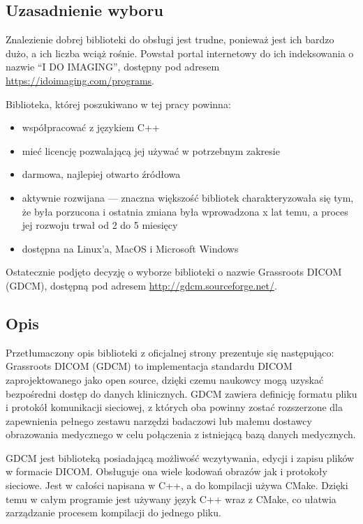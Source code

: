 

\subsection{Uzasadnienie wyboru}

\par
Znalezienie dobrej biblioteki do obsługi jest trudne, ponieważ jest ich bardzo dużo, a ich liczba wciąż rośnie.
Powstał portal internetowy do ich indeksowania o nazwie \enquote{I DO IMAGING}, dostępny pod adresem \url{https://idoimaging.com/programs}.
\par
Biblioteka, której poszukiwano w tej pracy powinna:
\begin{itemize}
    \item współpracować z językiem C++
    \item mieć licencję pozwalającą jej używać w potrzebnym zakresie
    \item darmowa, najlepiej otwarto źródłowa
    \item aktywnie rozwijana --- znaczna większość bibliotek charakteryzowała się tym, że była porzucona i ostatnia zmiana była wprowadzona x lat temu, a proces jej rozwoju trwał od 2 do 5 miesięcy
    \item dostępna na Linux'a, MacOS i Microsoft Windows
\end{itemize}
Ostatecznie podjęto decyzję o wyborze biblioteki o nazwie Grassroots DICOM (GDCM), dostępną pod adresem \url{http://gdcm.sourceforge.net/}.

\subsection{Opis}

\par
Przetłumaczony opis biblioteki z oficjalnej strony prezentuje się następująco:
Grassroots DICOM (GDCM) to implementacja standardu DICOM zaprojektowanego jako open source, dzięki czemu naukowcy mogą uzyskać bezpośredni dostęp do danych klinicznych.
GDCM zawiera definicję formatu pliku i protokół komunikacji sieciowej, z których oba powinny zostać rozszerzone dla zapewnienia pełnego zestawu narzędzi badaczowi lub małemu dostawcy obrazowania medycznego w celu połączenia z istniejącą bazą danych medycznych.

\par
GDCM jest biblioteką posiadającą możliwość wczytywania, edycji i zapisu plików w formacie DICOM.
Obsługuje ona wiele kodowań obrazów jak i protokoły sieciowe.
Jest w całości napisana w C++, a do kompilacji używa CMake.
Dzięki temu w całym programie jest używany język C++ wraz z CMake, co ułatwia zarządzanie procesem kompilacji do jednego pliku.

